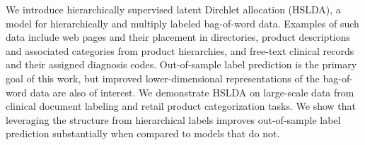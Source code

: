 We introduce hierarchically supervised latent Dirchlet allocation (HSLDA), a
model for hierarchically and multiply labeled bag-of-word data.  Examples of
such data include web pages and their placement in directories, product
descriptions and associated categories from product hierarchies, and free-text
clinical records and their assigned diagnosis codes. Out-of-sample label
prediction is the primary goal of this work, but improved lower-dimensional
representations of the bag-of-word data are also of interest.
We demonstrate HSLDA on large-scale data from clinical document labeling and
retail product categorization tasks. We show that leveraging the structure from
hierarchical labels improves out-of-sample label prediction substantially when
compared to models that do not. %


